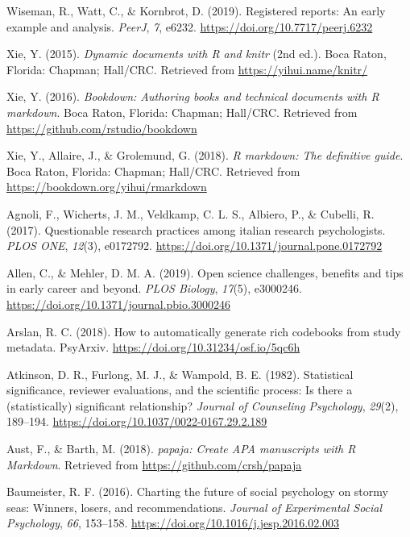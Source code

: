 \documentclass[british,,jou,floatsintext]{apa6}
\begin{document}
\leavevmode\hypertarget{ref-Wiseman2019}{}%
Wiseman, R., Watt, C., \& Kornbrot, D. (2019). Registered reports: An early example and analysis. \emph{PeerJ}, \emph{7}, e6232. \url{https://doi.org/10.7717/peerj.6232}

\leavevmode\hypertarget{ref-R-knitr}{}%
Xie, Y. (2015). \emph{Dynamic documents with R and knitr} (2nd ed.). Boca Raton, Florida: Chapman; Hall/CRC. Retrieved from \url{https://yihui.name/knitr/}

\leavevmode\hypertarget{ref-R-bookdown}{}%
Xie, Y. (2016). \emph{Bookdown: Authoring books and technical documents with R markdown}. Boca Raton, Florida: Chapman; Hall/CRC. Retrieved from \url{https://github.com/rstudio/bookdown}

\leavevmode\hypertarget{ref-R-rmarkdown}{}%
Xie, Y., Allaire, J., \& Grolemund, G. (2018). \emph{R markdown: The definitive guide}. Boca Raton, Florida: Chapman; Hall/CRC. Retrieved from \url{https://bookdown.org/yihui/rmarkdown}

\leavevmode\hypertarget{ref-Agnoli2017}{}%
Agnoli, F., Wicherts, J. M., Veldkamp, C. L. S., Albiero, P., \& Cubelli, R. (2017). Questionable research practices among italian research psychologists. \emph{PLOS ONE}, \emph{12}(3), e0172792. \url{https://doi.org/10.1371/journal.pone.0172792}

\leavevmode\hypertarget{ref-Allen2019}{}%
Allen, C., \& Mehler, D. M. A. (2019). Open science challenges, benefits and tips in early career and beyond. \emph{PLOS Biology}, \emph{17}(5), e3000246. \url{https://doi.org/10.1371/journal.pbio.3000246}

\leavevmode\hypertarget{ref-R-codebook}{}%
Arslan, R. C. (2018). How to automatically generate rich codebooks from study metadata. PsyArxiv. \url{https://doi.org/10.31234/osf.io/5qc6h}

\leavevmode\hypertarget{ref-Atkinson1982}{}%
Atkinson, D. R., Furlong, M. J., \& Wampold, B. E. (1982). Statistical significance, reviewer evaluations, and the scientific process: Is there a (statistically) significant relationship? \emph{Journal of Counseling Psychology}, \emph{29}(2), 189--194. \url{https://doi.org/10.1037/0022-0167.29.2.189}

\leavevmode\hypertarget{ref-R-papaja}{}%
Aust, F., \& Barth, M. (2018). \emph{papaja: Create APA manuscripts with R Markdown}. Retrieved from \url{https://github.com/crsh/papaja}

\leavevmode\hypertarget{ref-Baumeister2016}{}%
Baumeister, R. F. (2016). Charting the future of social psychology on stormy seas: Winners, losers, and recommendations. \emph{Journal of Experimental Social Psychology}, \emph{66}, 153--158. \url{https://doi.org/10.1016/j.jesp.2016.02.003}
\end{document}
